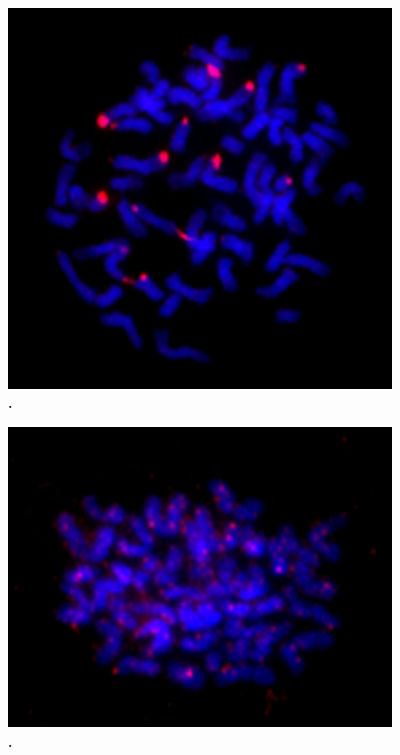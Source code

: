 \documentclass[10pt,letterpaper]{article}
\begin{document}
\begin{figure}[h]
\begin{center}
\includegraphics[width=4in]{Udig_TK271-Repeat.png}
\end{center}
\caption{{\bf .} }
\label{FISH}
\end{figure}

\begin{figure}[h]
\begin{center}
\includegraphics[width=4in]{Hypdip_TK177-Repet.png}
\end{center}
\caption{{\bf .} }
\label{FISH2}
\end{figure}
\end{document}
